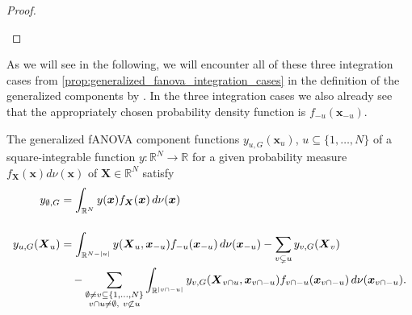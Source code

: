 \begin{proof}
\begin{center}
\end{center}
\end{proof}
As we will see in the following, we will encounter all of these three integration cases from \autoref{prop:generalized_fanova_integration_cases} in the definition of the generalized components by \cite{rahman2014}.
In the three integration cases we also already see that the appropriately chosen probability density function is $f_{-u}(\boldsymbol{x}_{-u})$.
\begin{proposition}\label{prop:generalized_fanova_components_rahman}
The generalized fANOVA component functions \( y_{u,G}(\boldsymbol{x}_u)\), \(u \subseteq \{1,\dots,N\}\) of a square-integrable function $y:\mathbb{R}^N \to \mathbb{R}$ for a given probability measure $f_{\boldsymbol{X}}(\boldsymbol{x}) d\nu(\boldsymbol{x})$ of $\boldsymbol{X} \in \mathbb{R}^N$ satisfy
\begin{align}
y_{\emptyset,G} &= \int_{\mathbb{R}^N} y(\boldsymbol{x}) f_{\boldsymbol{X}}(\boldsymbol{x}) \, d \nu(\boldsymbol{x}) \\[3ex]
y_{u,G}(\boldsymbol{X}_u) &= \int_{\mathbb{R}^{N - |u|}} y(\boldsymbol{X}_u, \boldsymbol{x}_{-u}) f_{-u}(\boldsymbol{x}_{-u}) \, d \nu(\boldsymbol{x}_{-u})
- \sum_{v \subsetneq u} y_{v,G}(\boldsymbol{X}_v) \notag \\
&\quad - \sum_{\substack{\emptyset \ne v \subseteq \{1,\dots,N\} \\ v \cap u \ne \emptyset,\ v \not\subset u}} 
\int_{\mathbb{R}^{|v \cap -u|}} y_{v,G}(\boldsymbol{X}_{v \cap u}, \boldsymbol{x}_{v \cap -u}) f_{v \cap -u}(\boldsymbol{x}_{v \cap -u}) \, d \nu(\boldsymbol{x}_{v \cap -u}).
\end{align}
\end{proposition}
